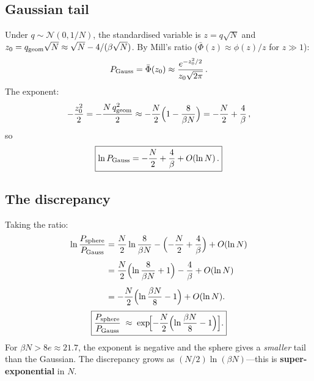 \documentclass[11pt]{article}
\begin{document}
\subsection{Gaussian tail}

Under $q \sim \mathcal{N}(0, 1/N)$, the standardised
variable is $z = q\sqrt{N}$ and
$z_0 = q_{\rm geom}\sqrt{N}
  \approx \sqrt{N} - 4/(\beta\sqrt{N})$.
By Mill's ratio ($\bar\Phi(z) \approx \phi(z)/z$
for $z \gg 1$):
\begin{equation}\label{eq:PGauss}
  P_{\rm Gauss}
  = \bar\Phi(z_0)
  \approx \frac{e^{-z_0^2/2}}{z_0\sqrt{2\pi}}\,.
\end{equation}
The exponent:
\begin{equation}
  -\frac{z_0^2}{2}
  = -\frac{N\,q_{\rm geom}^2}{2}
  \approx -\frac{N}{2}
    \Bigl(1 - \frac{8}{\beta N}\Bigr)
  = -\frac{N}{2} + \frac{4}{\beta}\,,
\end{equation}
so
\begin{equation}\label{eq:lnPgauss}
  \boxed{%
  \ln P_{\rm Gauss}
  = -\frac{N}{2} + \frac{4}{\beta} + O(\ln N)\,.}
\end{equation}


\subsection{The discrepancy}
\label{sec:discrepancy}

Taking the ratio:
\begin{align}
  \ln\frac{P_{\rm sphere}}{P_{\rm Gauss}}
  &= \frac{N}{2}\ln\frac{8}{\beta N}
    - \Bigl(-\frac{N}{2} + \frac{4}{\beta}\Bigr)
    + O(\ln N)
  \nonumber\\[4pt]
  &= \frac{N}{2}\Bigl(\ln\frac{8}{\beta N} + 1\Bigr)
    - \frac{4}{\beta}
    + O(\ln N)
  \nonumber\\[4pt]
  &= -\frac{N}{2}\Bigl(\ln\frac{\beta N}{8} - 1\Bigr)
    + O(\ln N).
  \label{eq:ratio}
\end{align}
\begin{equation}
  \boxed{%
  \frac{P_{\rm sphere}}{P_{\rm Gauss}}
  \;\approx\;
  \exp\!\Bigl[-\frac{N}{2}\Bigl(
    \ln\frac{\beta N}{8} - 1\Bigr)\Bigr].}
\end{equation}
For $\beta N > 8e \approx 21.7$, the exponent is negative
and the sphere gives a \emph{smaller} tail than the Gaussian.
The discrepancy grows as $(N/2)\ln(\beta N)$---this is
\textbf{super-exponential} in $N$.
\end{document}

